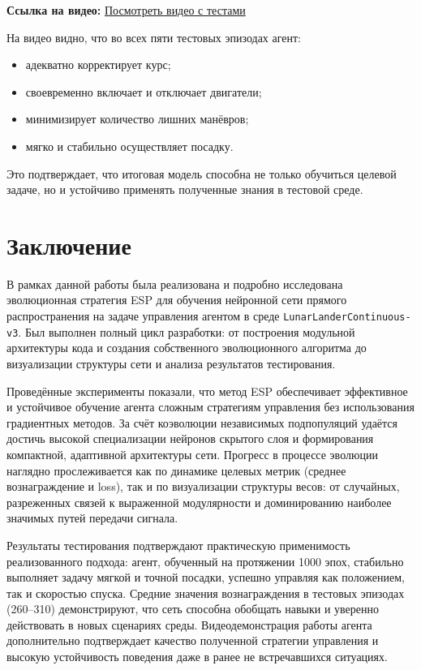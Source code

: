 \documentclass[a4paper,12pt]{article}
\begin{document}
\textbf{Ссылка на видео:} 
\href{https://drive.google.com/file/d/1ktwg2IDhtKPYz6kOzJnHerPcm4x3vGTp/view?usp=drive_link}
{Посмотреть видео с тестами}

На видео видно, что во всех пяти тестовых эпизодах агент:
\begin{itemize}
	\item адекватно корректирует курс;
	\item своевременно включает и отключает двигатели;
	\item минимизирует количество лишних манёвров;
	\item мягко и стабильно осуществляет посадку.
\end{itemize}

Это подтверждает, что итоговая модель способна не только обучиться целевой задаче, но и устойчиво применять полученные знания в тестовой среде.

\section{Заключение}

В рамках данной работы была реализована и подробно исследована эволюционная стратегия ESP для обучения нейронной сети прямого распространения на задаче управления агентом в среде \texttt{LunarLanderContinuous-v3}. Был выполнен полный цикл разработки: от построения модульной архитектуры кода и создания собственного эволюционного алгоритма до визуализации структуры сети и анализа результатов тестирования.

Проведённые эксперименты показали, что метод ESP обеспечивает эффективное и устойчивое обучение агента сложным стратегиям управления без использования градиентных методов. За счёт коэволюции независимых подпопуляций удаётся достичь высокой специализации нейронов скрытого слоя и формирования компактной, адаптивной архитектуры сети. Прогресс в процессе эволюции наглядно прослеживается как по динамике целевых метрик (среднее вознаграждение и loss), так и по визуализации структуры весов: от случайных, разреженных связей к выраженной модулярности и доминированию наиболее значимых путей передачи сигнала.

Результаты тестирования подтверждают практическую применимость реализованного подхода: агент, обученный на протяжении 1000 эпох, стабильно выполняет задачу мягкой и точной посадки, успешно управляя как положением, так и скоростью спуска. Средние значения вознаграждения в тестовых эпизодах (260--310) демонстрируют, что сеть способна обобщать навыки и уверенно действовать в новых сценариях среды. Видеодемонстрация работы агента дополнительно подтверждает качество полученной стратегии управления и высокую устойчивость поведения даже в ранее не встречавшихся ситуациях.
\end{document}
